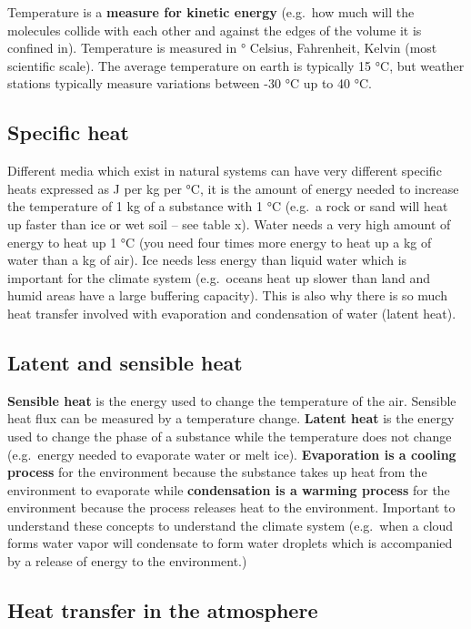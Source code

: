 \documentclass[oneside]{book}
\begin{document}
Temperature is a \textbf{measure for kinetic energy} (e.g.~how much will
the molecules collide with each other and against the edges of the
volume it is confined in). Temperature is measured in ° Celsius,
Fahrenheit, Kelvin (most scientific scale). The average temperature on
earth is typically 15 °C, but weather stations typically measure
variations between -30 °C up to 40 °C.

\subsection{Specific heat}\label{specific-heat}

Different media which exist in natural systems can have very different
specific heats expressed as J per kg per °C, it is the amount of energy
needed to increase the temperature of 1 kg of a substance with 1 °C
(e.g.~a rock or sand will heat up faster than ice or wet soil -- see
table x). Water needs a very high amount of energy to heat up 1 °C (you
need four times more energy to heat up a kg of water than a kg of air).
Ice needs less energy than liquid water which is important for the
climate system (e.g.~oceans heat up slower than land and humid areas
have a large buffering capacity). This is also why there is so much heat
transfer involved with evaporation and condensation of water (latent
heat).

\subsection{Latent and sensible heat}\label{latent-and-sensible-heat}

\textbf{Sensible heat} is the energy used to change the temperature of
the air. Sensible heat flux can be measured by a temperature change.
\textbf{Latent heat} is the energy used to change the phase of a
substance while the temperature does not change (e.g.~energy needed to
evaporate water or melt ice). \textbf{Evaporation is a cooling process}
for the environment because the substance takes up heat from the
environment to evaporate while \textbf{condensation is a warming
process} for the environment because the process releases heat to the
environment. Important to understand these concepts to understand the
climate system (e.g.~when a cloud forms water vapor will condensate to
form water droplets which is accompanied by a release of energy to the
environment.)

\subsection{Heat transfer in the
atmosphere}\label{heat-transfer-in-the-atmosphere}
\end{document}
